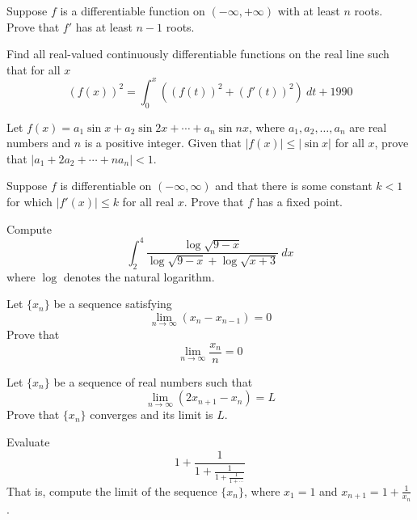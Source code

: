 \documentclass[12pt]{article}
\begin{document}
        \begin{exercise}
            Suppose $f$ is a differentiable function on $(-\infty, +\infty)$ with at least $n$ roots. Prove that $f'$ has at least $n-1$ roots.
        \end{exercise}
            
        \begin{exercise}
            Find all real-valued continuously differentiable functions on the real line such that for all $x$
            \[(f(x))^2 = \int_0^x \left((f(t))^2 + (f'(t))^2\right)\ dt + 1990\]
        \end{exercise}
            
        \begin{exercise} Let $f(x)=a_1\sin{x}+a_2\sin{2x}+\cdots + a_n\sin{nx}$, where $a_1,a_2,\dots,a_n$ are real numbers and $n$ is a positive integer. Given that $|f(x)|\leq |\sin{x}|$ for all $x$, prove that $|a_1+2a_2+\cdots+na_n|<1$.
        \end{exercise}
            
        \begin{exercise}
            Suppose $f$ is differentiable on $(-\infty, \infty)$ and that there is some constant $k<1$ for which $|f'(x)|\leq k$ for all real $x$. Prove that $f$ has a fixed point. 
        \end{exercise}
            
        \begin{exercise}
            Compute
            \[\int_2^4 \frac{\log\sqrt{9-x}}{\log\sqrt{9-x}+\log\sqrt{x+3}}\ dx\] where $\log$ denotes the natural logarithm.
        \end{exercise}

        \begin{exercise}
            Let $\{x_n\}$ be a sequence satisfying \[\lim_{n\to\infty} (x_n-x_{n-1}) = 0\] Prove that \[\lim_{n\to\infty} \frac{x_n}{n}= 0\]
        \end{exercise}
            
        \begin{exercise}
            Let $\{x_n\}$ be a sequence of real numbers such that \[ \lim_{n\to\infty} (2x_{n+1}-x_n)=L\] Prove that $\{x_n\}$ converges and its limit is $L$.
        \end{exercise}
            
        \begin{exercise}
            Evaluate
            \[1+\frac{1}{1+\frac{1}{1+\frac{1}{1+\cdots}}}\]
            That is, compute the limit of the sequence $\{x_n\}$, where $x_1 = 1$ and $x_{n+1}=1+\frac{1}{x_n}$.
        \end{exercise}
            
\end{document}
